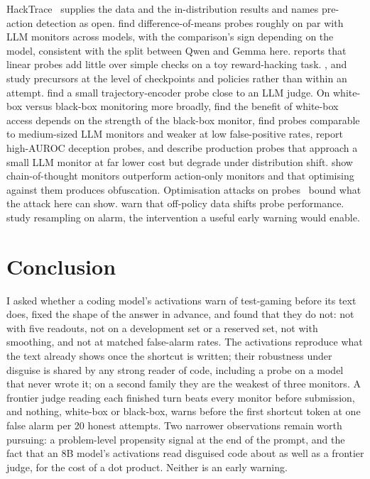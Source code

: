 \documentclass[10pt]{article}
\begin{document}
HackTrace~\citep{jiang2026hacktrace} supplies the data and the in-distribution results and names pre-action detection as open. \citet{bergen2026monitoring} find difference-of-means probes roughly on par with LLM monitors across models, with the comparison's sign depending on the model, consistent with the split between Qwen and Gemma here. \citet{dutta2026linear} reports that linear probes add little over simple checks on a toy reward-hacking task. \citet{wilhelm2026monitoring}, \citet{wilhelm2026from} and \citet{beigi2026proxy} study precursors at the level of checkpoints and policies rather than within an attempt. \citet{belenky2026cheap} find a small trajectory-encoder probe close to an LLM judge. On white-box versus black-box monitoring more broadly, \citet{parrack2025benchmarking} find the benefit of white-box access depends on the strength of the black-box monitor, \citet{mckenzie2025detecting} find probes comparable to medium-sized LLM monitors and weaker at low false-positive rates, \citet{goldowskydill2025detecting} report high-AUROC deception probes, and \citet{kramar2026building} describe production probes that approach a small LLM monitor at far lower cost but degrade under distribution shift. \citet{baker2025monitoring} show chain-of-thought monitors outperform action-only monitors and that optimising against them produces obfuscation. Optimisation attacks on probes~\citep{bailey2024obfuscated,gupta2025rlobfuscation,mcguinness2025neural} bound what the attack here can show. \citet{kirch2025the} warn that off-policy data shifts probe performance. \citet{bhatt2025ctrlz} study resampling on alarm, the intervention a useful early warning would enable.

\section{Conclusion}

I asked whether a coding model's activations warn of test-gaming before its text does, fixed the shape of the answer in advance, and found that they do not: not with five readouts, not on a development set or a reserved set, not with smoothing, and not at matched false-alarm rates. The activations reproduce what the text already shows once the shortcut is written; their robustness under disguise is shared by any strong reader of code, including a probe on a model that never wrote it; on a second family they are the weakest of three monitors. A frontier judge reading each finished turn beats every monitor before submission, and nothing, white-box or black-box, warns before the first shortcut token at one false alarm per 20 honest attempts. Two narrower observations remain worth pursuing: a problem-level propensity signal at the end of the prompt, and the fact that an 8B model's activations read disguised code about as well as a frontier judge, for the cost of a dot product. Neither is an early warning.
\end{document}
